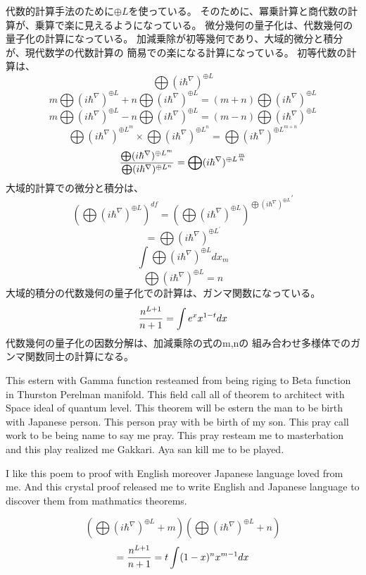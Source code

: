 \documentclass{jsarticle}
\begin{document}
         代数的計算手法のために$ \oplus L $を使っている。
そのために、冪乗計算と商代数の計算が、乗算で楽に見えるようになっている。
            微分幾何の量子化は、代数幾何の量子化の計算になっている。
  加減乗除が初等幾何であり、大域的微分と積分が、現代数学の代数計算の
  簡易での楽になる計算になっている。
  初等代数の計算は、
  $$ \bigoplus({i \hbar^{\nabla}})^{\oplus L} $$
   $$m \bigoplus({i \hbar^{\nabla}})^{\oplus L} +  
   n\bigoplus({i \hbar^{\nabla}})^{\oplus L} = 
   (m+n) \bigoplus({i \hbar^{\nabla}})^{\oplus L}   $$
   $$ m\bigoplus({i \hbar^{\nabla}})^{\oplus L} -  
   n\bigoplus({i \hbar^{\nabla}})^{\oplus L} = 
   (m-n) \bigoplus({i \hbar^{\nabla}})^{\oplus L}   $$
   $$ \bigoplus({i \hbar^{\nabla}})^{{\oplus L}^m} \times 
      \bigoplus({i \hbar^{\nabla}})^{{\oplus L}^n} =
   \bigoplus({i \hbar^{\nabla}})^{\oplus L^{m+n}} $$
  $$ {{\bigoplus({i \hbar^{\nabla}})^{\oplus L^m}}  \over  
  {\bigoplus({i \hbar^{\nabla}})^{\oplus L^n}}} =  
  \bigoplus({i \hbar^{\nabla}})^{\oplus L^{m\over n}} $$
  大域的計算での微分と積分は、
  $$ \left(\bigoplus({i \hbar^{\nabla}})^{\oplus L}\right)^{df}
  =  {\left(\bigoplus({i \hbar^{\nabla}})^{\oplus L}\right)^{
	  \bigoplus({i \hbar^{\nabla}})^{\oplus L}}}^{'}  $$
  $$ = \bigoplus({i \hbar^{\nabla}})^{\oplus L^{'}} $$
   $$ \int \bigoplus({i \hbar^{\nabla}})^{\oplus L} dx_m $$
   $$ \bigoplus({i \hbar^{\nabla}})^{\oplus L} = n $$
   大域的積分の代数幾何の量子化での計算は、ガンマ関数になっている。
   $$ {n^{L+1} \over {n+1}} = \int e^x x^{1 - t} dx $$
   代数幾何の量子化の因数分解は、加減乗除の式のm,nの
   組み合わせ多様体でのガンマ関数同士の計算になる。


       This estern with Gamma function resteamed from being riging to Beta function in Thurston
   Perelman manifold. This field call all of theorem to architect with Space ideal of quantum level.
     This theorem will be estern the man to be birth with Japanese person.
   This person pray with be birth of my son.
   This pray call work to be being name to say me pray.
   This pray resteam me to masterbation and this play realized me Gakkari.
   Aya san kill me to be played.

     I like this poem to proof with English moreover Japanese language loved from me.
     And this crystal proof released me to write English and Japanese language to discover them
     from mathmatics theorems.

   $$ \left(\bigoplus({i \hbar^{\nabla}})^{\oplus L}+m\right) 
   \left(\bigoplus({i \hbar^{\nabla}})^{\oplus L}+n\right) $$
  $$ = {n^{L+1} \over {n+1}} = t \int (1 - x)^n x^{m - 1} dx $$
\end{document}
